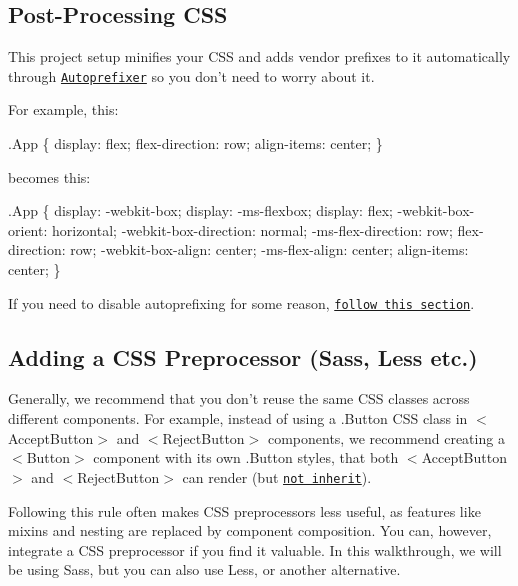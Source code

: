 \subsection*{Post-\/\+Processing C\+SS}

This project setup minifies your C\+SS and adds vendor prefixes to it automatically through \href{https://github.com/postcss/autoprefixer}{\tt Autoprefixer} so you don’t need to worry about it.

For example, this\+:


\begin{DoxyCode}
.App \{
  display: flex;
  flex-direction: row;
  align-items: center;
\}
\end{DoxyCode}


becomes this\+:


\begin{DoxyCode}
.App \{
  display: -webkit-box;
  display: -ms-flexbox;
  display: flex;
  -webkit-box-orient: horizontal;
  -webkit-box-direction: normal;
      -ms-flex-direction: row;
          flex-direction: row;
  -webkit-box-align: center;
      -ms-flex-align: center;
          align-items: center;
\}
\end{DoxyCode}


If you need to disable autoprefixing for some reason, \href{https://github.com/postcss/autoprefixer#disabling}{\tt follow this section}.

\subsection*{Adding a C\+SS Preprocessor (Sass, Less etc.)}

Generally, we recommend that you don’t reuse the same C\+SS classes across different components. For example, instead of using a {\ttfamily .Button} C\+SS class in {\ttfamily $<$Accept\+Button$>$} and {\ttfamily $<$Reject\+Button$>$} components, we recommend creating a {\ttfamily $<$Button$>$} component with its own {\ttfamily .Button} styles, that both {\ttfamily $<$Accept\+Button$>$} and {\ttfamily $<$Reject\+Button$>$} can render (but \href{https://facebook.github.io/react/docs/composition-vs-inheritance.html}{\tt not inherit}).

Following this rule often makes C\+SS preprocessors less useful, as features like mixins and nesting are replaced by component composition. You can, however, integrate a C\+SS preprocessor if you find it valuable. In this walkthrough, we will be using Sass, but you can also use Less, or another alternative.

